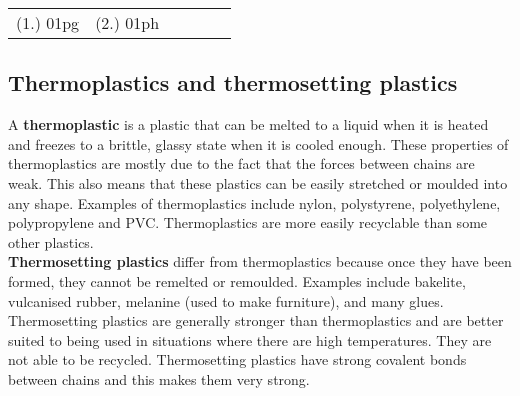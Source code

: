 {%
\par \practiceinfo
\par \begin{tabular}[h]{cccccc}
(1.)	01pg	&
(2.)	01ph	&
\end{tabular}

}


\subsection{Thermoplastics and thermosetting plastics}

A \textbf{thermoplastic} is a plastic that can be melted to a liquid when it is heated and freezes to a brittle, glassy state when it is cooled enough. These properties of thermoplastics are mostly due to the fact that the forces between chains are weak. This also means that these plastics can be easily stretched or moulded into any shape. Examples of thermoplastics include nylon, polystyrene, polyethylene, polypropylene and PVC. Thermoplastics are more easily recyclable than some other plastics.\\

\textbf{Thermosetting plastics} differ from thermoplastics because once they have been formed, they cannot be remelted or remoulded. Examples include bakelite, vulcanised rubber, melanine (used to make furniture), and many glues. Thermosetting plastics are generally stronger than thermoplastics and are better suited to being used in situations where there are high temperatures. They are not able to be recycled. Thermosetting plastics have strong covalent bonds between chains and this makes them very strong.

